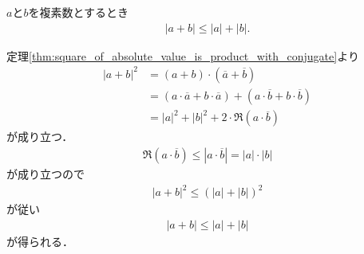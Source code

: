 	\begin{screen}
		\begin{thm}[劣加法性]
			$a$と$b$を複素数とするとき
			\begin{align}
				|a + b| \leq |a| + |b|.
			\end{align}
		\end{thm}
	\end{screen}
	
	\begin{sketch}
		定理\ref{thm:square_of_absolute_value_is_product_with_conjugate}より
		\begin{align}
			|a + b|^2 &= (a + b) \cdot (\overline{a} + \overline{b}) \\
			&= (a \cdot \overline{a} + b \cdot \overline{a})
			+ (a \cdot \overline{b} + b \cdot \overline{b}) \\
			&= |a|^2 + |b|^2 + 2 \cdot \Re{(a \cdot \overline{b})}
		\end{align}
		が成り立つ．
		\begin{align}
			\Re{(a \cdot \overline{b})}
			\leq |a \cdot \overline{b}|
			= |a| \cdot |b|
		\end{align}
		が成り立つので
		\begin{align}
			|a + b|^2 \leq (|a| + |b|)^2
		\end{align}
		が従い
		\begin{align}
			|a + b| \leq |a| + |b|
		\end{align}
		が得られる．
		\QED
	\end{sketch}
	